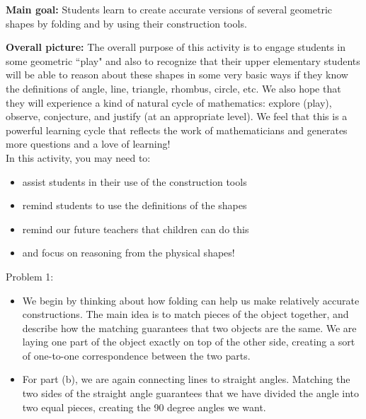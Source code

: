 \documentclass[noauthor, nooutcomes,handout]{ximera}
\begin{document}
\begin{instructorNotes}

{\bf Main goal:} Students learn to create accurate versions of several geometric shapes by folding and by using their construction tools.

{\bf Overall picture:} 
The overall purpose of this activity is to engage students in some  geometric ``play" and also to recognize that their upper elementary students will be able to reason about these shapes in some very basic ways if they know the definitions of angle, line, triangle, rhombus, circle, etc.  We also hope that they will experience a kind of natural cycle of mathematics: explore (play), observe, conjecture, and justify (at an appropriate level). We feel that this is a powerful learning cycle that reflects the work of mathematicians and generates more questions and a love of learning!\\

In this activity, you may need to:
\begin{itemize}
    \item assist students in their use of the construction tools
    \item remind students to use the definitions of the shapes
    \item remind our future teachers that children can do this
    \item and focus on reasoning from the physical shapes!
\end{itemize}

Problem 1:
\begin{itemize}
	\item We begin by thinking about how folding can help us make relatively accurate constructions. The main idea is to match pieces of the object together, and describe how the matching guarantees that two objects are the same. We are laying one part of the object exactly on top of the other side, creating a sort of one-to-one correspondence between the two parts.
	\item For part (b), we are again connecting lines to straight angles. Matching the two sides of the straight angle guarantees that we have divided the angle into two equal pieces, creating the 90 degree angles we want.
\end{itemize}


\end{instructorNotes}
\end{document}
